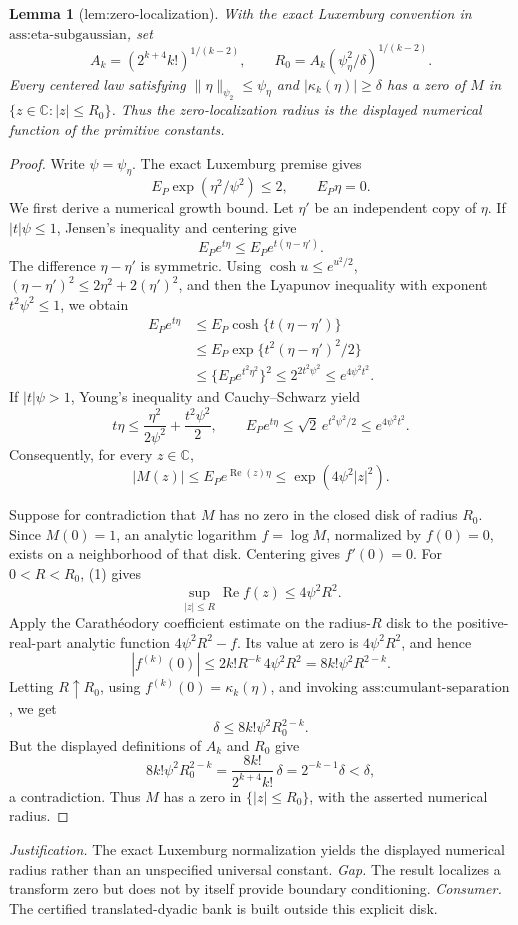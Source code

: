 \documentclass{article}
\newtheorem{lemma}{Lemma}
\begin{document}
\begin{lemma}[lem:zero-localization]\label{lem:zero-localization}
With the exact Luxemburg convention in \(\text{ass:eta-subgaussian}\), set
\[
 A_k=(2^{k+4}k!)^{1/(k-2)},
 \qquad
 R_0=A_k(\psi_{\eta}^2/\delta)^{1/(k-2)}.
\]
Every centered law satisfying \(\|\eta\|_{\psi_2}\le\psi_{\eta}\) and \(|\kappa_k(\eta)|\ge\delta\) has a zero of \(M\) in \(\{z\in\mathbb C:|z|\le R_0\}\). Thus the zero-localization radius is the displayed numerical function of the primitive constants.
\end{lemma}
\begin{proof}
Write \(\psi=\psi_{\eta}\).  The exact Luxemburg premise gives
\[
 E_P\exp(\eta^2/\psi^2)\le2,
 \qquad E_P\eta=0.
\]
We first derive a numerical growth bound.  Let \(\eta'\) be an independent copy of \(\eta\).  If \(|t|\psi\le1\), Jensen's inequality and centering give
\[
 E_Pe^{t\eta}\le E_Pe^{t(\eta-\eta')}.
\]
The difference \(\eta-\eta'\) is symmetric.  Using \(\cosh u\le e^{u^2/2}\), \((\eta-\eta')^2\le2\eta^2+2(\eta')^2\), and then the Lyapunov inequality with exponent \(t^2\psi^2\le1\), we obtain
\[
\begin{aligned}
 E_Pe^{t\eta}
 &\le E_P\cosh\{t(\eta-\eta')\}\\
 &\le E_P\exp\{t^2(\eta-\eta')^2/2\}\\
 &\le \{E_Pe^{t^2\eta^2}\}^2
 \le 2^{2t^2\psi^2}
 \le e^{4\psi^2t^2}.
\end{aligned}
\]
If \(|t|\psi>1\), Young's inequality and Cauchy--Schwarz yield
\[
 t\eta\le\frac{\eta^2}{2\psi^2}+\frac{t^2\psi^2}{2},
 \qquad
 E_Pe^{t\eta}\le\sqrt2\,e^{t^2\psi^2/2}
 \le e^{4\psi^2t^2}.
\]
Consequently, for every \(z\in\mathbb C\),
\[
 |M(z)|\le E_Pe^{\operatorname{Re}(z)\eta}
 \le \exp(4\psi^2|z|^2). \tag{1}
\]

Suppose for contradiction that \(M\) has no zero in the closed disk of radius \(R_0\).  Since \(M(0)=1\), an analytic logarithm \(f=\log M\), normalized by \(f(0)=0\), exists on a neighborhood of that disk.  Centering gives \(f'(0)=0\).  For \(0<R<R_0\), (1) gives
\[
 \sup_{|z|\le R}\operatorname{Re}f(z)\le4\psi^2R^2.
\]
Apply the Carath\'eodory coefficient estimate on the radius-\(R\) disk to the positive-real-part analytic function \(4\psi^2R^2-f\).  Its value at zero is \(4\psi^2R^2\), and hence
\[
 |f^{(k)}(0)|
 \le 2k!R^{-k}\,4\psi^2R^2
 =8k!\psi^2R^{2-k}. \tag{2}
\]
Letting \(R\uparrow R_0\), using \(f^{(k)}(0)=\kappa_k(\eta)\), and invoking \(\text{ass:cumulant-separation}\), we get
\[
 \delta\le8k!\psi^2R_0^{2-k}.
\]
But the displayed definitions of \(A_k\) and \(R_0\) give
\[
 8k!\psi^2R_0^{2-k}
 =\frac{8k!}{2^{k+4}k!}\,\delta
 =2^{-k-1}\delta<\delta,
\]
a contradiction.  Thus \(M\) has a zero in \(\{|z|\le R_0\}\), with the asserted numerical radius.
\end{proof}
\par\smallskip\noindent \textit{Justification.} The exact Luxemburg normalization yields the displayed numerical radius rather than an unspecified universal constant. \textit{Gap.} The result localizes a transform zero but does not by itself provide boundary conditioning. \textit{Consumer.} The certified translated-dyadic bank is built outside this explicit disk.
\end{document}
